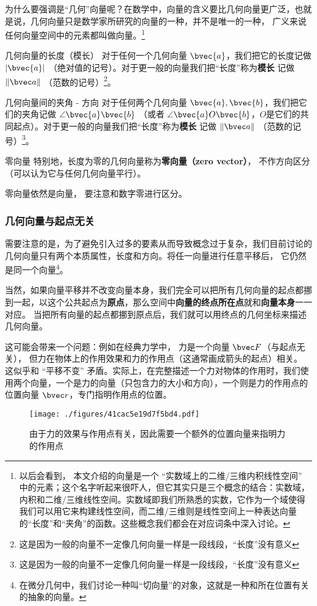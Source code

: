 为什么要强调是“几何”向量呢？在数学中，向量的含义要比几何向量更广泛，也就是说，几何向量只是数学家所研究的向量的一种，并不是唯一的一种， 广义来说任何向量空间中的元素都叫做向量。\footnote{以后会看到， 本文介绍的向量是一个 “实数域上的二维/三维内积线性空间” 中的元素；这个名字听起来很吓人，但它其实只是三个概念的结合：实数域，内积和二维/三维线性空间。实数域即我们所熟悉的实数，它作为一个域使得我们可以用它来构建线性空间，而二维/三维则是线性空间上一种表达向量的“长度”和“夹角”的函数。这些概念我们都会在对应词条中深入讨论。}

\begin{definition}{几何向量的长度（模长）}
对于任何一个几何向量 $\bvec{a}$，我们把它的长度记做 $|\bvec{a}|$ （绝对值的记号）。对于更一般的向量我们把“长度”称为\textbf{模长} 记做 $\|\bvec a\|$ （范数的记号）\footnote{这是因为一般的向量不一定像几何向量一样是一段线段，“长度”没有意义}。
\end{definition}


\begin{definition}{几何向量间的夹角 - 方向}
对于任何两个几何向量 $\bvec{a}, \bvec{b}$，我们把它们的夹角记做 $\angle \bvec{a} \bvec{b}$ （或者 $\angle \bvec{a} O \bvec{b}$，$O$是它们的共同起点）。对于更一般的向量我们把“长度”称为\textbf{模长} 记做 $\|\bvec a\|$ （范数的记号）\footnote{这是因为一般的向量不一定像几何向量一样是一段线段，“长度”没有意义}。
\end{definition}


\begin{definition}{零向量}
特别地，长度为零的几何向量称为\textbf{零向量（zero vector）}， 不作方向区分（可以认为它与任何几何向量平行）。
\end{definition}
零向量依然是向量， 要注意和数字零进行区分。

\subsubsection{几何向量与起点无关}
需要注意的是，为了避免引入过多的要素从而导致概念过于复杂，我们目前讨论的几何向量只有两个本质属性，长度和方向。将任一向量进行任意平移后， 它仍然是同一个向量\footnote{在微分几何中，我们讨论一种叫“切向量”的对象，这就是一种和所在位置有关的抽象的向量。}。

当然，如果向量平移并不改变向量本身，我们完全可以把所有几何向量的起点都挪到一起，以这个公共起点为\textbf{原点}，那么空间中\textbf{向量的终点所在点}就和\textbf{向量本身}一一对应。 当把所有向量的起点都挪到原点后，我们就可以用终点的几何坐标来描述几何向量。

这可能会带来一个问题：例如在经典力学中， 力是一个向量 $\bvec F$（与起点无关）， 但力在物体上的作用效果和力的作用点（这通常画成箭头的起点）相关。 这似乎和 “平移不变” 矛盾。实际上，在完整描述一个力对物体的作用时，我们使用两个向量，一个是力的向量（只包含力的大小和方向），一个则是力的作用点的位置向量 $\bvec r$，专门指明作用点的位置。
\begin{figure}[ht]
\centering
\texttt{[image: ./figures/41cac5e19d7f5bd4.pdf]}
\caption{由于力的效果与作用点有关，因此需要一个额外的位置向量来指明力的作用点} \label{fig_GVec_5}
\end{figure}

